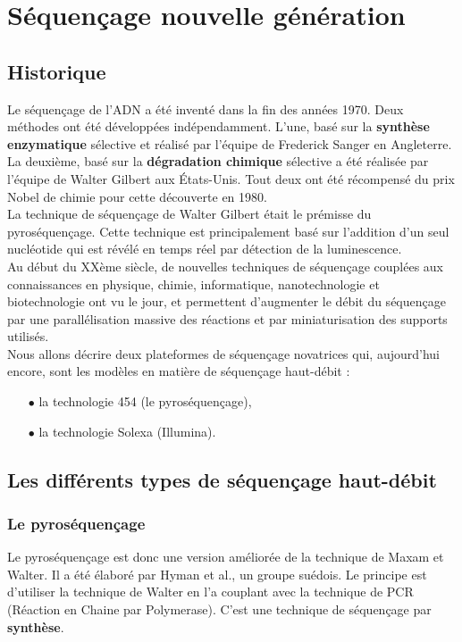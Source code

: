 \section{Séquençage nouvelle génération}
\subsection*{Historique}
	Le séquençage de l'ADN a été inventé dans la fin des années 1970.
Deux méthodes ont été développées indépendamment.
L'une, basé sur la \textbf{synthèse enzymatique} sélective et réalisé par l'équipe de Frederick Sanger en Angleterre.
La deuxième, basé sur la \textbf{dégradation chimique} sélective a été réalisée par l'équipe de Walter Gilbert aux États-Unis.
Tout deux ont été récompensé du prix Nobel de chimie pour cette découverte en 1980.\\


La technique de séquençage de Walter Gilbert était le prémisse du pyroséquençage. Cette technique est principalement basé sur l'addition d'un seul nucléotide qui est révélé en temps réel par détection de la  luminescence. 
~~\\
Au début du XXème siècle, de nouvelles techniques de séquençage couplées aux connaissances en physique, chimie, informatique, nanotechnologie et biotechnologie ont vu le jour, et permettent d'augmenter le débit du séquençage par une parallélisation massive des réactions et par miniaturisation des supports utilisés.
~~\\
Nous allons décrire deux plateformes de séquençage novatrices qui, aujourd'hui encore, sont les modèles en matière de séquençage haut-débit :
~~\\
\begin{itemize}
\item[$\bullet$]la technologie 454 (le pyroséquençage),
\item[$\bullet$]la technologie Solexa (Illumina).
\end{itemize}
	
\subsection*{Les différents types de séquençage haut-débit{\scriptsize \cite{NGS}\cite{NGS2}\cite{NGS3}\cite{NGS4}\cite{NGS5}}}
	\subsubsection*{Le pyroséquençage}

Le pyroséquençage est donc une version améliorée de la technique de Maxam et Walter. Il a été élaboré par Hyman et al., un groupe suédois. Le principe est d'utiliser la technique de Walter en l'a couplant avec la technique de PCR (Réaction en Chaine par Polymerase). C'est une technique de séquençage par \textbf{synthèse}.

